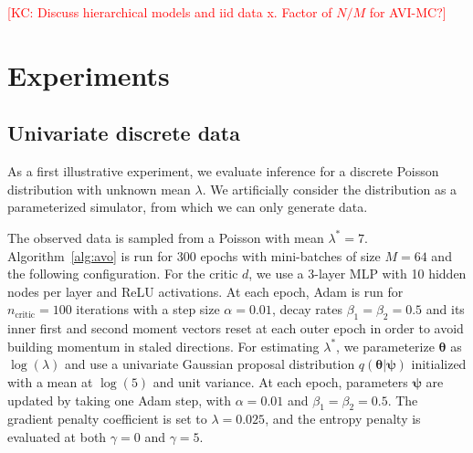 \documentclass[twocolumn,superscriptaddress,aps]{revtex4-1}
\newcommand{\kcnote}[1]{\textcolor{red}{[KC: #1]}}
\newcommand{\bftheta}{{\bm \theta}}
\newcommand{\bfpsi}{{\bm \psi}}
\theoremstyle{plain}
\begin{document}
\kcnote{Discuss hierarchical models and iid data x. Factor of $N/M$ for AVI-MC?}



\section{Experiments}

\subsection{Univariate discrete data}

As a first illustrative experiment, we evaluate inference for a discrete Poisson
distribution with unknown mean $\lambda$. We artificially consider
the distribution as a parameterized simulator, from which we can only
generate data.

The observed data is sampled from a Poisson with mean $\lambda^* = 7$.
Algorithm~\ref{alg:avo} is run for 300 epochs with mini-batches of size $M=64$
and the following configuration. For the critic $d$, we use a 3-layer MLP with 10
hidden nodes per layer and ReLU activations. At each epoch, Adam is run for
$n_\text{critic}=100$ iterations with a step size $\alpha=0.01$, decay rates
$\beta_1=\beta_2=0.5$ and its inner first and second moment vectors reset at
each outer epoch in order to avoid building momentum in staled directions.  For
estimating $\lambda^*$, we parameterize $\bftheta$ as $\log(\lambda)$ and use a univariate Gaussian proposal distribution
$q(\bftheta|\bfpsi)$ initialized with a mean at $\log(5)$ and unit variance. At
each epoch, parameters $\bfpsi$ are updated by taking one Adam step, with
$\alpha=0.01$ and $\beta_1=\beta_2=0.5$. The gradient penalty coefficient is set to
$\lambda=0.025$, and the entropy penalty is evaluated at both $\gamma=0$ and $\gamma=5$.
\end{document}
